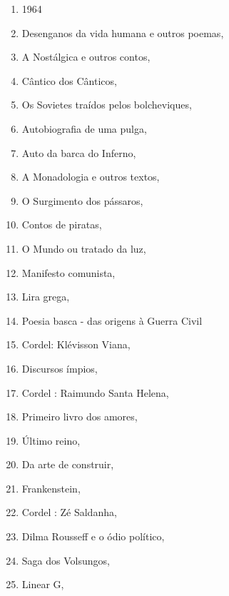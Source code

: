 \begin{multicols}{2}
\begin{enumerate}
\item 1964
\item Desenganos da vida humana e outros poemas, {}
\item A Nostálgica e outros contos, {}
\item Cântico dos Cânticos, {}
\item Os Sovietes traídos pelos bolcheviques, {}
\item Autobiografia de uma pulga, {}
\item Auto da barca do Inferno, {}
\item A Monadologia e outros textos, {}
\item O Surgimento dos pássaros, {}
\item Contos de piratas, {}
\item O Mundo ou tratado da luz, {}
\item Manifesto comunista, {}
\item Lira grega, {}
\item Poesia basca - das origens à Guerra Civil
\item Cordel: Klévisson Viana, {}
\item Discursos ímpios, {}
\item Cordel : Raimundo Santa Helena, {}
\item Primeiro livro dos amores, {}
\item Último reino, {}
\item Da arte de construir, {}
\item Frankenstein, {}
\item Cordel : Zé Saldanha, {}
\item Dilma Rousseff e o ódio político, {}
\item Saga dos Volsungos, {}
\item Linear G, {}

\end{enumerate}
\end{multicols}
